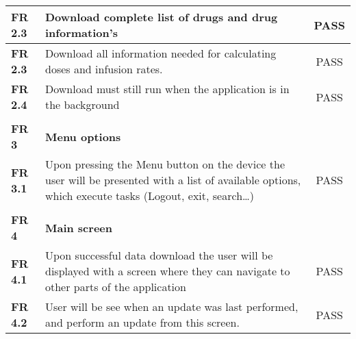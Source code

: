 \begin{center}
\begin{longtable}{| l | p{11cm} | c |}
\textbf{FR 2.3}                 & Download complete list of drugs and drug information’s                                                                                                                     & PASS      \\ \hline
\textbf{FR 2.3}                 & Download all information needed for calculating doses and infusion rates.                                                                                                  & PASS      \\ \hline
\textbf{FR 2.4}                 & Download must still run when the application is in the background                                                                                                          & PASS      \\ \hline
\textbf{}                       &                                                                                                                                                                            &           \\ \hline
\textbf{FR 3}                   & \textbf{Menu options}                                                                                                                                                      &           \\ \hline
\textbf{FR 3.1}                 & Upon pressing the Menu button on the device the user will be presented with a list of available options, which execute tasks (Logout, exit, search…)                       & PASS      \\ \hline
\textbf{}                       &                                                                                                                                                                            &           \\ \hline
\textbf{FR 4}                   & \textbf{Main screen}                                                                                                                                                       &           \\ \hline
\textbf{FR 4.1}                 & Upon successful data download the user will be displayed with a screen where they can navigate to other parts of the application                                           & PASS      \\ \hline
\textbf{FR 4.2}                 & User will be see when an update was last performed, and perform an update from this screen.                                                                                & PASS      \\ \hline

\end{longtable}
\end{center}
